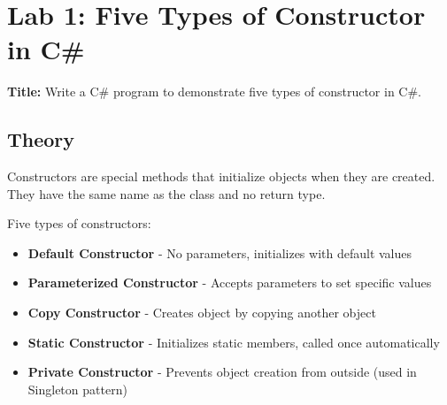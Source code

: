 \documentclass[10pt,a4paper]{article}
\begin{document}
\newpage
\section*{Lab 1: Five Types of Constructor in C\#}

\textbf{Title:} Write a C\# program to demonstrate five types of constructor in C\#.

\subsection*{Theory}
Constructors are special methods that initialize objects when they are created. They have the same name as the class and no return type.

Five types of constructors:
\begin{itemize}
    \item \textbf{Default Constructor} - No parameters, initializes with default values
    \item \textbf{Parameterized Constructor} - Accepts parameters to set specific values
    \item \textbf{Copy Constructor} - Creates object by copying another object
    \item \textbf{Static Constructor} - Initializes static members, called once automatically
    \item \textbf{Private Constructor} - Prevents object creation from outside (used in Singleton pattern)
\end{itemize}
\end{document}
